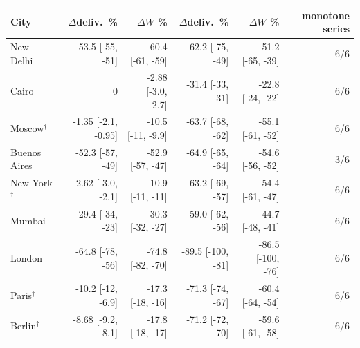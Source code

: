 \begin{tabular}{lrrrrr}
\toprule
City & $\Delta$deliv.\ \% & $\Delta W$ \% & $\Delta$deliv.\ \% & $\Delta W$ \% & monotone series \\
\midrule
New Delhi & -53.5 [-55, -51] & -60.4 [-61, -59] & -62.2 [-75, -49] & -51.2 [-65, -39] & 6/6 \\
Cairo$^\dagger$ & 0 & -2.88 [-3.0, -2.7] & -31.4 [-33, -31] & -22.8 [-24, -22] & 6/6 \\
Moscow$^\dagger$ & -1.35 [-2.1, -0.95] & -10.5 [-11, -9.9] & -63.7 [-68, -62] & -55.1 [-61, -52] & 6/6 \\
Buenos Aires & -52.3 [-57, -49] & -52.9 [-57, -47] & -64.9 [-65, -64] & -54.6 [-56, -52] & 3/6 \\
New York$^\dagger$ & -2.62 [-3.0, -2.1] & -10.9 [-11, -11] & -63.2 [-69, -57] & -54.4 [-61, -47] & 6/6 \\
Mumbai & -29.4 [-34, -23] & -30.3 [-32, -27] & -59.0 [-62, -56] & -44.7 [-48, -41] & 6/6 \\
London & -64.8 [-78, -56] & -74.8 [-82, -70] & -89.5 [-100, -81] & -86.5 [-100, -76] & 6/6 \\
Paris$^\dagger$ & -10.2 [-12, -6.9] & -17.3 [-18, -16] & -71.3 [-74, -67] & -60.4 [-64, -54] & 6/6 \\
Berlin$^\dagger$ & -8.68 [-9.2, -8.1] & -17.8 [-18, -17] & -71.2 [-72, -70] & -59.6 [-61, -58] & 6/6 \\
\bottomrule
\end{tabular}
